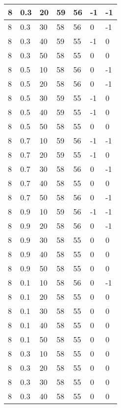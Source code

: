 \begin{longtable}{|l|l|l|l|l|l|l|}
		8     & 0.3 & 20   & 59 & 56 & -1  & -1  \\ \hline
		8     & 0.3 & 30   & 58 & 56 & 0   & -1  \\ \hline
		8     & 0.3 & 40   & 59 & 55 & -1  & 0   \\ \hline
		8     & 0.3 & 50   & 58 & 55 & 0   & 0   \\ \hline
		8     & 0.5 & 10   & 58 & 56 & 0   & -1  \\ \hline
		8     & 0.5 & 20   & 58 & 56 & 0   & -1  \\ \hline
		8     & 0.5 & 30   & 59 & 55 & -1  & 0   \\ \hline
		8     & 0.5 & 40   & 59 & 55 & -1  & 0   \\ \hline
		8     & 0.5 & 50   & 58 & 55 & 0   & 0   \\ \hline
		8     & 0.7 & 10   & 59 & 56 & -1  & -1  \\ \hline
		8     & 0.7 & 20   & 59 & 55 & -1  & 0   \\ \hline
		8     & 0.7 & 30   & 58 & 56 & 0   & -1  \\ \hline
		8     & 0.7 & 40   & 58 & 55 & 0   & 0   \\ \hline
		8     & 0.7 & 50   & 58 & 56 & 0   & -1  \\ \hline
		8     & 0.9 & 10   & 59 & 56 & -1  & -1  \\ \hline
		8     & 0.9 & 20   & 58 & 56 & 0   & -1  \\ \hline
		8     & 0.9 & 30   & 58 & 55 & 0   & 0   \\ \hline
		8     & 0.9 & 40   & 58 & 55 & 0   & 0   \\ \hline
		8     & 0.9 & 50   & 58 & 55 & 0   & 0   \\ \hline
		8     & 0.1 & 10   & 58 & 56 & 0   & -1  \\ \hline
		8     & 0.1 & 20   & 58 & 55 & 0   & 0   \\ \hline
		8     & 0.1 & 30   & 58 & 55 & 0   & 0   \\ \hline
		8     & 0.1 & 40   & 58 & 55 & 0   & 0   \\ \hline
		8     & 0.1 & 50   & 58 & 55 & 0   & 0   \\ \hline
		8     & 0.3 & 10   & 58 & 55 & 0   & 0   \\ \hline
		8     & 0.3 & 20   & 58 & 55 & 0   & 0   \\ \hline
		8     & 0.3 & 30   & 58 & 55 & 0   & 0   \\ \hline
		8     & 0.3 & 40   & 58 & 55 & 0   & 0   \\ \hline

\end{longtable}
